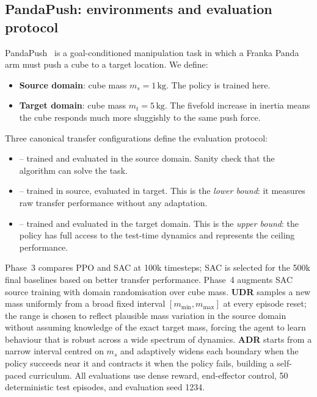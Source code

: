 \documentclass[10pt,twocolumn,letterpaper]{article}
\begin{document}
\subsection{PandaPush: environments and evaluation protocol}

PandaPush~\cite{gallouedec2021pandagym} is a goal-conditioned manipulation task in which a Franka Panda arm must push a cube to a target location. We define:
\begin{itemize}
\item \textbf{Source domain}: cube mass $m_s = 1\,\text{kg}$. The policy is trained here.
\item \textbf{Target domain}: cube mass $m_t = 5\,\text{kg}$. The fivefold increase in inertia means the cube responds much more sluggishly to the same push force.
\end{itemize}

Three canonical transfer configurations define the evaluation protocol:
\begin{itemize}
\item \textbf{\sourcesource} -- trained and evaluated in the source domain. Sanity check that the algorithm can solve the task.
\item \textbf{\sourcetarget} -- trained in source, evaluated in target. This is the \emph{lower bound}: it measures raw transfer performance without any adaptation.
\item \textbf{\targettarget} -- trained and evaluated in the target domain. This is the \emph{upper bound}: the policy has full access to the test-time dynamics and represents the ceiling performance.
\end{itemize}

Phase~3 compares PPO and SAC at 100k timesteps; SAC is selected for the 500k final baselines based on better transfer performance. Phase~4 augments SAC source training with domain randomisation over cube mass. \textbf{UDR} samples a new mass uniformly from a broad fixed interval $[m_{\min}, m_{\max}]$ at every episode reset; the range is chosen to reflect plausible mass variation in the source domain without assuming knowledge of the exact target mass, forcing the agent to learn behaviour that is robust across a wide spectrum of dynamics. \textbf{ADR} starts from a narrow interval centred on $m_s$ and adaptively widens each boundary when the policy succeeds near it and contracts it when the policy fails, building a self-paced curriculum. All evaluations use dense reward, end-effector control, 50 deterministic test episodes, and evaluation seed 1234.
\end{document}

